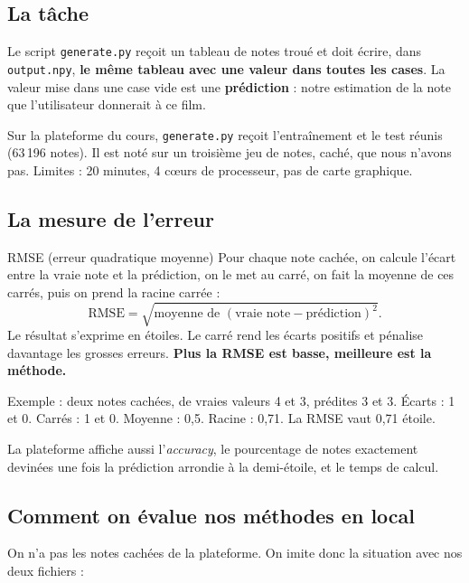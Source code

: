 \documentclass[11pt,a4paper]{article}
\begin{document}
\subsection{La tâche}

Le script \texttt{generate.py} reçoit un tableau de notes troué et doit écrire, dans
\texttt{output.npy}, \textbf{le même tableau avec une valeur dans toutes les cases}.
La valeur mise dans une case vide est une \textbf{prédiction} : notre estimation de la
note que l'utilisateur donnerait à ce film.

Sur la plateforme du cours, \texttt{generate.py} reçoit l'entraînement et le test réunis
(63\,196 notes). Il est noté sur un troisième jeu de notes, caché, que nous n'avons pas.
Limites : 20 minutes, 4 c\oe urs de processeur, pas de carte graphique.

\subsection{La mesure de l'erreur}

\begin{definition}{RMSE (erreur quadratique moyenne)}
Pour chaque note cachée, on calcule l'écart entre la vraie note et la prédiction, on le
met au carré, on fait la moyenne de ces carrés, puis on prend la racine carrée :
\[
  \mathrm{RMSE} = \sqrt{\text{moyenne de } (\text{vraie note} - \text{prédiction})^2} .
\]
Le résultat s'exprime en étoiles. Le carré rend les écarts positifs et pénalise davantage
les grosses erreurs. \textbf{Plus la RMSE est basse, meilleure est la méthode.}
\end{definition}

Exemple : deux notes cachées, de vraies valeurs 4 et 3, prédites 3 et 3. Écarts : 1 et 0.
Carrés : 1 et 0. Moyenne : 0,5. Racine : 0,71. La RMSE vaut 0,71 étoile.

La plateforme affiche aussi l'\emph{accuracy}, le pourcentage de notes exactement
devinées une fois la prédiction arrondie à la demi-étoile, et le temps de calcul.

\subsection{Comment on évalue nos méthodes en local}

On n'a pas les notes cachées de la plateforme. On imite donc la situation avec nos deux
fichiers :
\end{document}
